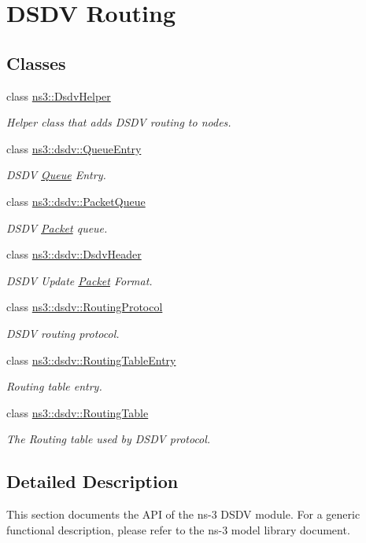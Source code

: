 \hypertarget{group__dsdv}{}\section{D\+S\+DV Routing}
\label{group__dsdv}
\subsection*{Classes}
\begin{DoxyCompactItemize}
\item 
class \hyperlink{classns3_1_1DsdvHelper}{ns3\+::\+Dsdv\+Helper}
\begin{DoxyCompactList}\small\item\em Helper class that adds D\+S\+DV routing to nodes. \end{DoxyCompactList}\item 
class \hyperlink{classns3_1_1dsdv_1_1QueueEntry}{ns3\+::dsdv\+::\+Queue\+Entry}
\begin{DoxyCompactList}\small\item\em D\+S\+DV \hyperlink{classns3_1_1Queue}{Queue} Entry. \end{DoxyCompactList}\item 
class \hyperlink{classns3_1_1dsdv_1_1PacketQueue}{ns3\+::dsdv\+::\+Packet\+Queue}
\begin{DoxyCompactList}\small\item\em D\+S\+DV \hyperlink{classns3_1_1Packet}{Packet} queue. \end{DoxyCompactList}\item 
class \hyperlink{classns3_1_1dsdv_1_1DsdvHeader}{ns3\+::dsdv\+::\+Dsdv\+Header}
\begin{DoxyCompactList}\small\item\em D\+S\+DV Update \hyperlink{classns3_1_1Packet}{Packet} Format. \end{DoxyCompactList}\item 
class \hyperlink{classns3_1_1dsdv_1_1RoutingProtocol}{ns3\+::dsdv\+::\+Routing\+Protocol}
\begin{DoxyCompactList}\small\item\em D\+S\+DV routing protocol. \end{DoxyCompactList}\item 
class \hyperlink{classns3_1_1dsdv_1_1RoutingTableEntry}{ns3\+::dsdv\+::\+Routing\+Table\+Entry}
\begin{DoxyCompactList}\small\item\em Routing table entry. \end{DoxyCompactList}\item 
class \hyperlink{classns3_1_1dsdv_1_1RoutingTable}{ns3\+::dsdv\+::\+Routing\+Table}
\begin{DoxyCompactList}\small\item\em The Routing table used by D\+S\+DV protocol. \end{DoxyCompactList}\end{DoxyCompactItemize}


\subsection{Detailed Description}
This section documents the A\+PI of the ns-\/3 D\+S\+DV module. For a generic functional description, please refer to the ns-\/3 model library document. 